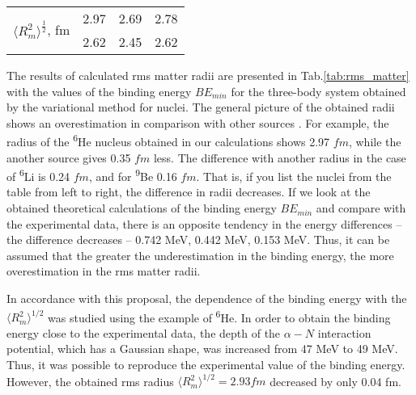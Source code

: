 \documentclass[
12pt, %
oneside, %
english, %
onehalfspacing, %
onehalfspacing, %
headsepline, %
]{MastersDoctoralThesis} %
\newcommand{\he}{\textsuperscript{6}He\xspace}
\newcommand{\li}{\textsuperscript{6}Li\xspace}
\newcommand{\be}{\textsuperscript{9}Be\xspace}
\begin{document}
\begin{table}[bp]
\begin{tabular*}{\textwidth}{@{\extracolsep{\fill}}lccc@{}}
\multirow{2}{*}{$\langle R^{2}_m\rangle^{\frac{1}{2}}$, fm} & 2.97                                                                                                                                                                                              & 2.69                                                                                                                                                                                                                                                                                                     & 2.78                                                                                                                                                                                                                                                                                                     \\
                                       & 2.62 \cite{antonov2005charge}                                                                                                                                                                                       & 2.45 \cite{egelhof2003nuclear}
                                       & 2.62 \cite{hirai2011clustering} \\  \bottomrule
\end{tabular*}
\end{table}

The results of calculated rms matter radii are presented in Tab.\ref{tab:rms_matter} with the values of the binding energy $BE_{min}$ for the three-body system obtained by the variational method for nuclei. 
The general picture of the obtained radii shows an overestimation in comparison with other sources \cite{antonov2005charge, egelhof2003nuclear, hirai2011clustering} . 
For example, the radius of the \he nucleus obtained in our calculations shows 2.97 $fm$, while the another source gives 0.35 $fm$ less. 
The difference with another radius in the case of \li is 0.24 $fm$, and for \be 0.16 $fm$. 
That is, if you list the nuclei from the table from left to right, the difference in radii decreases. 
If we look at the obtained theoretical calculations of the binding energy $BE_{min}$ and compare with the experimental data, there is an opposite tendency in the energy differences -- the difference decreases -- 0.742 MeV, 0.442 MeV, 0.153 MeV. 
Thus, it can be assumed that the greater the underestimation in the binding energy, the more overestimation in the rms matter radii.


In accordance with this proposal, the dependence of the binding energy with the $\langle R_{m}^2 \rangle^{1/2}$ was studied using the example of \he. In order to obtain the binding energy close to the experimental data, the depth of the $\alpha-N$ interaction potential, which has a Gaussian shape, was increased from 47 MeV to 49 MeV. Thus, it was possible to reproduce the experimental value of the binding energy. However, the obtained rms radius $\langle R_{m}^2 \rangle^{1/2}=2.93 fm$ decreased by only 0.04 fm.
\end{document}
